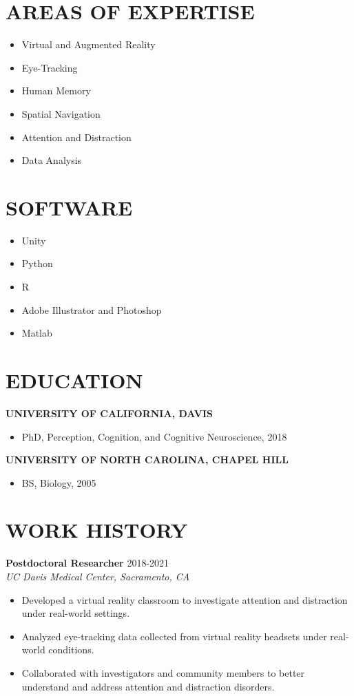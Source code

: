 \documentclass[line,margin,10pt]{res}
\begin{document}
\begin{resume}
\section{AREAS OF EXPERTISE} 
\begin{itemize} \itemsep -2pt
\item Virtual and Augmented Reality
\item Eye-Tracking
\item Human Memory
\item Spatial Navigation
\item Attention and Distraction
\item Data Analysis
\end{itemize}

\section{SOFTWARE} 
\begin{itemize} \itemsep -2pt
\item Unity 
\item Python
\item R
\item Adobe Illustrator and Photoshop
\item Matlab
\end{itemize}

\section{EDUCATION} 
\textbf{UNIVERSITY OF CALIFORNIA, DAVIS}
\begin{itemize} \itemsep -2pt
\item  []PhD, Perception, Cognition, and Cognitive Neuroscience, 2018
\end{itemize}

\textbf{UNIVERSITY OF NORTH CAROLINA, CHAPEL HILL}
\begin{itemize} \itemsep -2pt
\item  []BS, Biology, 2005
\end{itemize}

\section{WORK HISTORY} 

\textbf{Postdoctoral Researcher } \hfill 2018-2021 \\
\emph{UC Davis Medical Center, Sacramento, CA}\\
\begin{itemize} 
\item Developed a virtual reality classroom to investigate attention and distraction under real-world settings.
\item Analyzed eye-tracking data collected from virtual reality headsets under real-world conditions.
\item Collaborated with investigators and community members to better understand and address attention and distraction disorders.
\end{itemize}


\end{resume}
\end{document}
